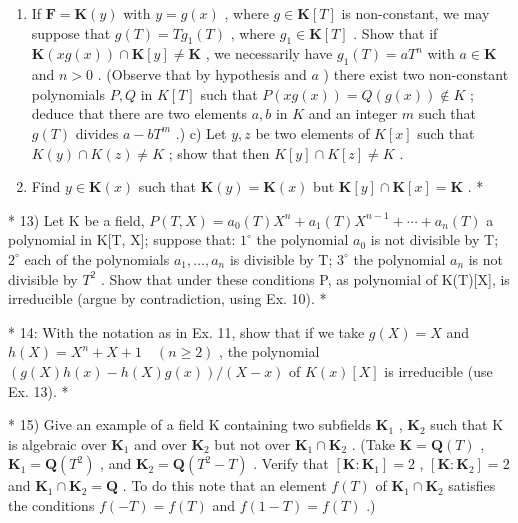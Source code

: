 \begin{enumerate}
\def\labelenumi{\alph{enumi})}
\setcounter{enumi}{1}
\item
  If \(\mathbf{F} = \mathbf{K}(y)\) with \(y = g(x)\) , where \(g \in \mathbf{K}[T]\) is non-constant, we may suppose that \(g(T) = Tg_1(T)\) , where \(g_1 \in \mathbf{K}[T]\) . Show that if \(\mathbf{K}(xg(x)) \cap \mathbf{K}[y] \neq \mathbf{K}\) , we necessarily have \(g_1(T) = aT^n\) with \(a \in \mathbf{K}\) and \(n > 0\) . (Observe that by hypothesis and \(a\) ) there exist two non-constant polynomials \(P, Q\) in \(K[T]\) such that \(P(xg(x)) = Q(g(x)) \notin K\) ; deduce that there are two elements \(a, b\) in \(K\) and an integer \(m\) such that \(g(T)\) divides \(a - bT^m\) .) c) Let \(y, z\) be two elements of \(K[x]\) such that \(K(y) \cap K(z) \neq K\) ; show that then \(K[y] \cap K[z] \neq K\) .
\item
  Find \(y \in \mathbf{K}(x)\) such that \(\mathbf{K}(y) = \mathbf{K}(x)\) but \(\mathbf{K}[y] \cap \mathbf{K}[x] = \mathbf{K}\) . *
\end{enumerate}

* 13) Let K be a field, \(P(T, X) = a_0(T)X^n + a_1(T)X^{n-1} + \cdots + a_n(T)\) a polynomial in K{[}T, X{]}; suppose that: \(1^\circ\) the polynomial \(a_0\) is not divisible by T; \(2^\circ\) each of the polynomials \(a_1, \ldots, a_n\) is divisible by T; \(3^\circ\) the polynomial \(a_n\) is not divisible by \(T^2\) . Show that under these conditions P, as polynomial of K(T){[}X{]}, is irreducible (argue by contradiction, using Ex. 10). *

* 14: With the notation as in Ex. 11, show that if we take \(g(X) = X\) and \(h(X) = X^n + X + 1 \quad (n \geqslant 2)\) , the polynomial \((g(X)h(x) - h(X)g(x)) / (X - x)\) of \(K(x)[X]\) is irreducible (use Ex. 13). *

* 15) Give an example of a field K containing two subfields \(\mathbf{K}_1\) , \(\mathbf{K}_2\) such that K is algebraic over \(\mathbf{K}_1\) and over \(\mathbf{K}_2\) but not over \(\mathbf{K}_1 \cap \mathbf{K}_2\) . (Take \(\mathbf{K} = \mathbf{Q}(T)\) , \(\mathbf{K}_1 = \mathbf{Q}(T^2)\) , and \(\mathbf{K}_2 = \mathbf{Q}(T^2 - T)\) . Verify that \([\mathbf{K} : \mathbf{K}_1] = 2\) , \([\mathbf{K} : \mathbf{K}_2] = 2\) and \(\mathbf{K}_1 \cap \mathbf{K}_2 = \mathbf{Q}\) . To do this note that an element \(f(T)\) of \(\mathbf{K}_1 \cap \mathbf{K}_2\) satisfies the conditions \(f(-T) = f(T)\) and \(f(1 - T) = f(T)\) .)

\BourbakiExerciseGroup

